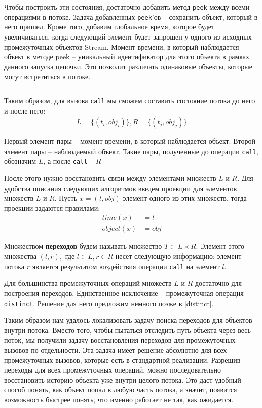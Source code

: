 Чтобы построить эти состояния, достаточно добавить метод \texttt{peek} между всеми операциями в потоке. Задача добавленных \texttt{peek}'ов -- сохранить объект, который в него пришел. Кроме того, добавим глобальное время, которое будет увеличиваться, когда следующий элемент будет запрошен у одного из исходных промежуточных объектов Stream. Момент времени, в который наблюдается объект в методе peek -- уникальный идентификатор для этого объекта в рамках данного запуска цепочки. Это позволит различать одинаковые объекты, которые могут встретиться в потоке.

\inputminted{java}{chapter2/code/LocalChainModification.java}

Таким образом, для вызова \texttt{call} мы сможем составить состояние потока до него и после него:
\begin{equation*}
	L = \{(t_i, obj_i)\}, R = \{(t_j, obj_j)\}
\end{equation*}

Первый элемент пары -- момент времени, в который наблюдается объект. Второй элемент пары -- наблюдаемый объект. Такие пары, полученные до операции \texttt{call}, обозначим $L$, а после \texttt{call} -- $R$

После этого нужно восстановить связи между элементами множеств $L$ и $R$. Для удобства описания следующих алгоритмов введем проекции для элементов множеств $L$ и $R$. Пусть $x = (t, obj)$ элемент одного из этих множеств, тогда проекции задаются правилами:
\begin{align*}
	time(x) &= t \\
	object(x) &= obj
\end{align*}

Множеством \textbf{переходов} будем называть множество $T \subset L \times R$. Элемент этого множества $(l, r), $ где $l \in L, r \in R$ несет следующую информацию: элемент потока $r$ является результатом воздействия операции \texttt{call} на элемент $l$.

Для большинства промежуточных операций множеств $L$ и $R$ достаточно для построения переходов. Единственное исключение -- промежуточная операция \texttt{distinct}. Решение для него предложим немного позже в \ref{distinct}.

Таким образом нам удалось локализовать задачу поиска переходов для объектов внутри потока. Вместо того, чтобы пытаться отследить путь объекта через весь поток, мы получили задачу восстановления переходов для промежуточных вызовов по-отдельности. Эта задача имеет решение абсолютно для всех промежуточных вызовов, которые есть в стандартной реализации. Разрешив переходы для всех промежуточных операций, можно последовательно восстановить историю объекта уже внутри целого потока. Это даст удобный способ понять, как объект попал в любую часть потока, а значит, появится возможность быстрее понять, что именно работает не так, как ожидается.
